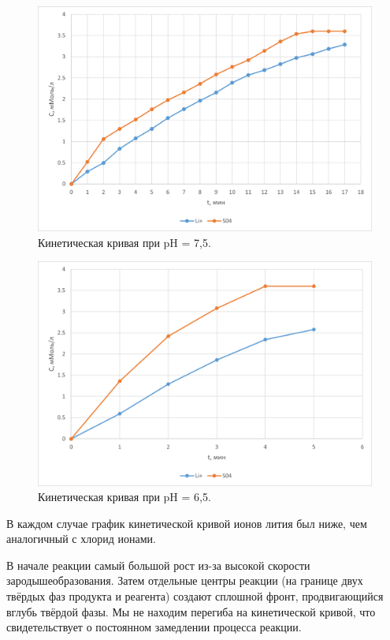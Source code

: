 \documentclass[a4paper,12pt]{article} %
\begin{document}
\begin{figure}[H]
    \centering
    \includegraphics[scale=1]{Рисунок3.png}
    \caption{Кинетическая кривая при pH = 7,5.
}
    \label{pic:3}
\end{figure}

\begin{figure}[H]
    \centering
    \includegraphics[scale=1]{Рисунок4.png}
    \caption{Кинетическая кривая при pH = 6,5.
}
    \label{pic:4}
\end{figure}


В каждом случае график кинетической кривой ионов лития был ниже, чем аналогичный с хлорид ионами. 

В начале реакции самый большой рост из-за высокой скорости зародышеобразования. Затем отдельные центры реакции (на границе двух твёрдых фаз продукта и реагента) создают сплошной фронт, продвигающийся вглубь твёрдой фазы. Мы не находим перегиба на кинетической кривой, 
что свидетельствует о постоянном замедлении процесса реакции.
\end{document}
